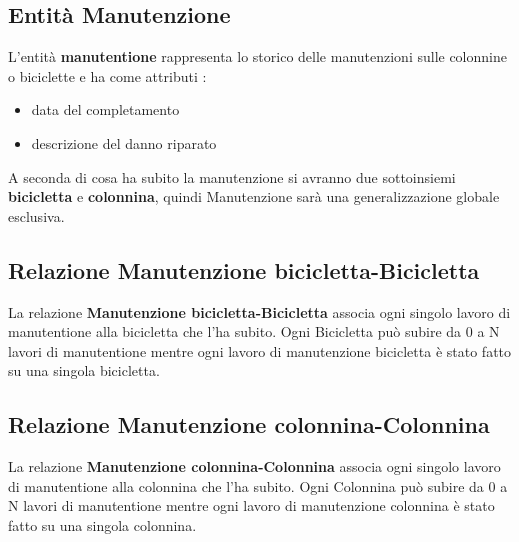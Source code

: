 \documentclass[a4paper,twoside]{article}
\begin{document}
\subsection{Entità Manutenzione}
L'entità \textbf{manutentione} rappresenta lo storico delle manutenzioni sulle colonnine o biciclette e ha come attributi :
\begin{itemize}
 \item data del completamento
 \item descrizione del danno riparato
\end{itemize}
A seconda di cosa ha subito la manutenzione si avranno due sottoinsiemi \textbf{bicicletta} e \textbf{colonnina}, quindi Manutenzione sarà una generalizzazione globale esclusiva.

\subsection{Relazione Manutenzione bicicletta-Bicicletta}
La relazione \textbf{Manutenzione bicicletta-Bicicletta} associa ogni singolo lavoro di manutentione alla bicicletta che l'ha subito.\newline
Ogni Bicicletta può subire da 0 a N lavori di manutentione mentre ogni lavoro di manutenzione bicicletta è stato fatto su una singola bicicletta.

\subsection{Relazione Manutenzione colonnina-Colonnina}
La relazione \textbf{Manutenzione colonnina-Colonnina} associa ogni singolo lavoro di manutentione alla colonnina che l'ha subito.\newline
Ogni Colonnina può subire da 0 a N lavori di manutentione mentre ogni lavoro di manutenzione colonnina è stato fatto su una singola colonnina.
\end{document}
